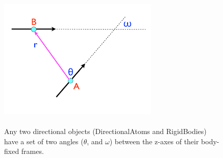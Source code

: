 \documentclass[]{book}
\begin{document}
\begin{figure} [H]
\centering
\includegraphics[width=3in]{definition.pdf}
\caption[Definitions of the angles between directional objects]{ \\ Any
two directional objects (DirectionalAtoms and RigidBodies) have a set
of two angles ($\theta$, and $\omega$) between the z-axes of their
body-fixed frames.} 
\label{fig:gofr}
\end{figure}
\end{document}
